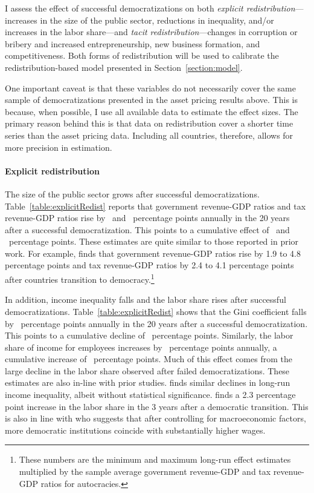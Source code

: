 I assess the effect of successful democratizations on both \textit{explicit redistribution}---increases in the size of the public sector, reductions in inequality, and/or increases in the labor share---and \textit{tacit redistribution}---changes in corruption or bribery and increased entrepreneurship, new business formation, and competitiveness.  Both forms of redistribution will be used to calibrate the redistribution-based model presented in Section~\ref{section:model}. 

One important caveat is that these variables do not necessarily cover the same sample of democratizations presented in the asset pricing results above. This is because, when possible, I use all available data to estimate the effect sizes. The primary reason behind this is that data on redistribution cover a shorter time series than the asset pricing data. Including all countries, therefore, allows for more precision in estimation.

\paragraph{Explicit redistribution}
The size of the public sector grows after successful democratizations. Table~\ref{table:explicitRedist} reports that government revenue-GDP ratios and tax revenue-GDP ratios rise by \tabEightcolOnePE\ and \tabEightcolTwoPE\ percentage points annually in the 20 years after a successful democratization. This points to a cumulative effect of \tabEightOneCE\ and \tabEightTwoCE\ percentage points. These estimates are quite similar to those reported in prior work. For example, \cite{Acemoglu2015} finds that government revenue-GDP ratios rise by 1.9 to 4.8 percentage points  and tax revenue-GDP ratios by 2.4 to 4.1 percentage points after countries transition to democracy.\footnote{These numbers are the minimum and maximum long-run effect estimates multiplied by the sample average government revenue-GDP and tax revenue-GDP ratios for autocracies.}

In addition, income inequality falls and the labor share rises after successful democratizations.  Table~\ref{table:explicitRedist} shows that the Gini coefficient falls by \tabEightcolThreePE\ percentage points annually in the 20 years after a successful democratization. This points to a cumulative decline of \tabEightThreeCE\ percentage points.  Similarly, the labor share of income for employees increases by \tabEightcolFourPE\ percentage points annually, a cumulative increase of \tabEightFourCE\ percentage points. Much of this effect comes from the large decline in the labor share observed after failed democratizations. These estimates are also in-line with prior studies. \cite{Acemoglu2015} finds similar declines in long-run income inequality, albeit without statistical significance. \cite*{Drautzburg2022}  finds a 2.3 percentage point increase in the labor share in the 3 years after a democratic transition. This is also in line with \cite{Rodrik1999} who suggests that after controlling for macroeconomic factors, more democratic institutions coincide with substantially higher wages.

